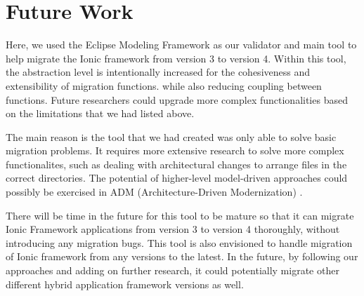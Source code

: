 \documentclass[conference]{IEEEtran}
\begin{document}
\section{Future Work}
Here, we used the Eclipse Modeling Framework as our validator and main tool to help migrate the Ionic framework 
from version 3 to version 4. Within this tool, the abstraction level is intentionally increased for the 
cohesiveness and extensibility of migration functions. while also reducing coupling between 
functions. Future researchers could upgrade more complex functionalities based on the limitations that 
we had listed above.

The main reason is the tool that we had created was only able to solve basic migration problems. 
It requires more extensive research to solve more complex functionalites, such as dealing with 
architectural changes to arrange files in the correct directories. The potential of
higher-level model-driven approaches could possibly be exercised in ADM (Architecture-Driven Modernization) \cite{b2}. 

There will be time in the future for this tool to be mature so that it can migrate Ionic Framework applications from version 
3 to version 4 thoroughly, without introducing any migration bugs.
This tool is also envisioned to handle migration of Ionic framework from 
any versions to the latest. In the future, by following our approaches and adding on further research, 
it could potentially migrate other different hybrid application framework versions as well.
\end{document}
